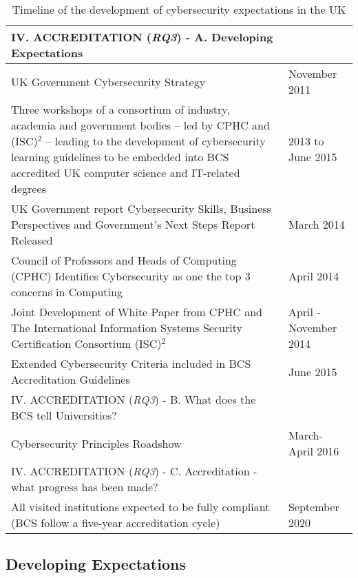 \documentclass[conference]{IEEEtran}
\begin{document}
{%
  \begin{table}[h!]
  \caption{Timeline of the development of cybersecurity expectations in the UK}
  \label{table:1}
  \begin{tabular}{ | p{6cm} |p{1.5cm} |}
    \hline
    IV. ACCREDITATION ({\emph{RQ3}}) - A. Developing Expectations &  \\ \hline
    UK Government Cybersecurity Strategy \cite{ukcyberstrategy:2016} & November 2011 \\ \hline
    Three workshops of a consortium of industry, academia and government bodies -- led by CPHC and  (ISC)$^2$ -- leading to the development of cybersecurity learning guidelines to be embedded into BCS accredited UK computer science and IT-related degrees~\cite{CPHCISC2}  & 2013 to June 2015 \\ \hline
    UK Government report Cybersecurity Skills, Business Perspectives and Government's Next Steps Report Released \cite{UKCabinetOffice2014} & March 2014  \\ \hline
    Council of Professors and Heads of Computing (CPHC) Identifies Cybersecurity as one the top 3 concerns in Computing & April 2014 \\ \hline
    Joint Development of White Paper from CPHC and The International Information Systems Security Certification Consortium (ISC)$^2$ \cite{CPHCISC2014} & April -November 2014 \\ \hline
    Extended Cybersecurity Criteria included in BCS Accreditation Guidelines \cite{BCS2018a}& June 2015 \\
    \hline
    IV. ACCREDITATION ({\emph{RQ3}}) - B. What does the BCS tell Universities? & \\ \hline
    Cybersecurity Principles Roadshow & March-April 2016 \\ \hline
    IV. ACCREDITATION ({\emph{RQ3}}) - C. Accreditation - what progress has been made? &  \\ \hline
    All visited institutions expected to be fully compliant 
 (BCS follow a five-year accreditation cycle)  & September 2020\\ \hline
  \end{tabular}
  \end{table}

\subsection{Developing Expectations}

}
\end{document}
